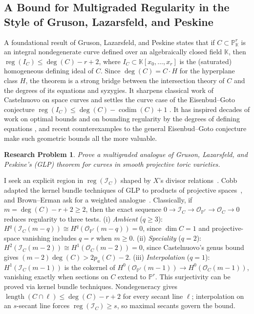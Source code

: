 \documentclass[11pt,reqno]{amsart}
\newtheorem{problem}[lemma]{Research Problem}
\theoremstyle{remark}
\newcommand{\reg}{\operatorname{reg}}
\newcommand{\length}{\operatorname{length}}
\newcommand{\codim}{\operatorname{codim}}
\newcommand{\KK}{\mathbb{K}}
\newcommand{\PP}{\mathbb{P}}
\newcommand{\cI}{\mathcal{I}}
\newcommand{\cO}{\mathcal{O}}
\begin{document}
 \subsection{A Bound for Multigraded Regularity in the Style of Gruson, Lazarsfeld, and Peskine}
 A foundational result of Gruson, Lazarsfeld, and Peskine \cite{GLP83} states that if $C \subset \PP^r_{\KK}$ is an integral nondegenerate curve defined over an algebraically closed field $\KK$, then $\reg\left(I_{C}\right) \leq \deg(C)-r+2$, where $I_{C} \subset \KK[x_0,\ldots,x_r]$ is the (saturated) homogeneous defining ideal of $C$. Since $\deg(C) = C \cdot H$ for the hyperplane class $H$, the theorem is a strong bridge between the intersection theory of $C$ and the degrees of its equations and syzygies. It sharpens classical work of Castelnuovo \cite{castelnuovo1893} on space curves and settles the curve case of the Eisenbud--Goto conjecture $\reg(I_C) \leq \deg(C) - \codim(C) + 1$ \cite{eisenbudGoto84}. It has inspired decades of work on optimal bounds \cite{pinkham86,lazarsfeld87,kwak98,kwak00,giaimo06} and on bounding regularity by the degrees of defining equations \cite{BEL91,einLazarsfeld93,CEL01,lozovanuSmith12}, and recent counterexamples to the general Eisenbud--Goto conjecture \cite{MP18,CCMPV19,McCulloughPeeva20} make such geometric bounds all the more valuable.

 \begin{problem}\label{prob:GLP}
 	Prove a multigraded analogue of Gruson, Lazarsfeld, and Peskine's (GLP) theorem for curves in smooth projective toric varieties.
\end{problem}

I seek an explicit region in $\reg(\cI_C)$ shaped by $X$'s divisor relations~\cite{maclaganSmith04}. Cobb adapted the kernel bundle techniques of GLP to products of projective spaces~\cite{GLP83,cobb24}, and Brown--Erman ask for a weighted analogue~\cite[Ques.~7.5]{brownErman25}. Classically, if $m=\deg(C)-r+2\geq2$, then the exact sequence $0\to\cI_C\to\cO_{\PP^r}\to\cO_C\to0$ reduces regularity to three tests. (i) \emph{Ambient} ($q\geq3$): $H^q(\cI_C(m-q))\cong H^q(\cO_{\PP^r}(m-q))=0$, since $\dim C=1$ and projective-space vanishing includes $q=r$ when $m\geq0$. (ii) \emph{Speciality} ($q=2$): $H^2(\cI_C(m-2))\cong H^1(\cO_C(m-2))=0$, since Castelnuovo's genus bound gives $(m-2)\deg(C)>2p_a(C)-2$. (iii) \emph{Interpolation} ($q=1$): $H^1(\cI_C(m-1))$ is the cokernel of $H^0(\cO_{\PP^r}(m-1))\to H^0(\cO_C(m-1))$, vanishing exactly when sections on $C$ extend to $\PP^r$. This surjectivity can be proved via kernel bundle techniques. Nondegeneracy gives $\length(C\cap\ell)\leq\deg(C)-r+2$ for every secant line $\ell$; interpolation on an $s$-secant line forces $\reg(\cI_C)\geq s$, so maximal secants govern the bound.
\end{document}
